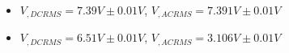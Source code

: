 \begin{itemize}
     \item $V_{, DCRMS}=7.39V\pm 0.01\unit{V}$, $V_{, ACRMS}=7.391V\pm 0.01\unit{V}$ 
     \item $V_{, DCRMS}=6.51V\pm 0.01\unit{V}$, $V_{, ACRMS}=3.106V\pm 0.01\unit{V}$\\
\end{itemize}